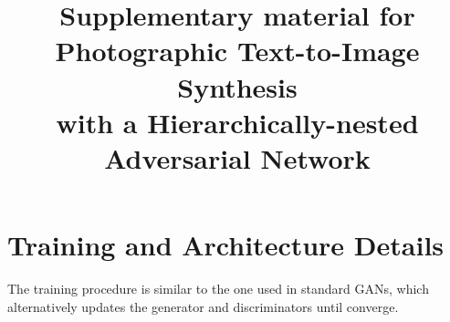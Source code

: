 \documentclass[10pt, letterpaper]{article}
\begin{document}

\title{Supplementary material for Photographic Text-to-Image Synthesis \\ with a Hierarchically-nested Adversarial Network}

\maketitle




\section{Training and Architecture Details}
The training procedure is similar to the one used in standard GANs, which alternatively updates the generator and discriminators until converge.
\end{document}
